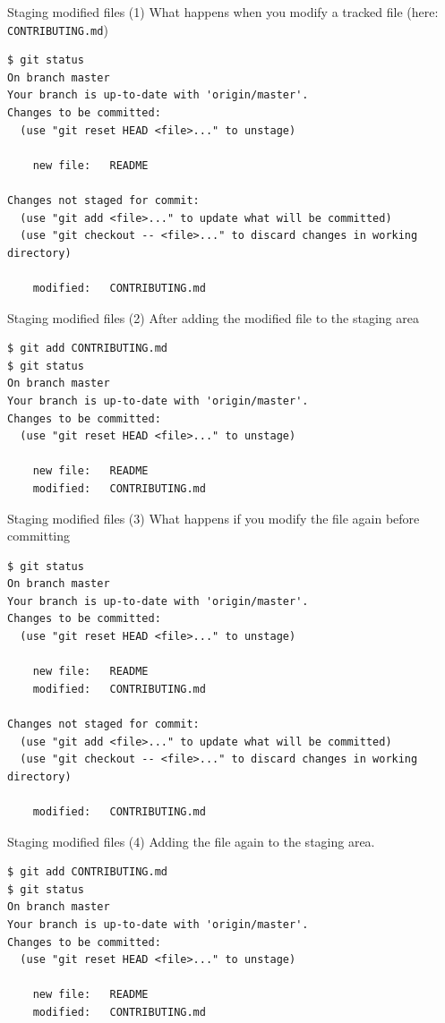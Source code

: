 \documentclass[handout]{beamer}
\begin{document}
\begin{frame}[fragile]{Staging modified files (1)}
What happens when you modify a tracked file (here: \texttt{CONTRIBUTING.md})
\begin{lstlisting}
$ git status
On branch master
Your branch is up-to-date with 'origin/master'.
Changes to be committed:
  (use "git reset HEAD <file>..." to unstage)

    new file:   README

Changes not staged for commit:
  (use "git add <file>..." to update what will be committed)
  (use "git checkout -- <file>..." to discard changes in working directory)

    modified:   CONTRIBUTING.md
\end{lstlisting}
\end{frame}

\begin{frame}[fragile]{Staging modified files (2)}
After adding the modified file to the staging area
\begin{lstlisting}
$ git add CONTRIBUTING.md
$ git status
On branch master
Your branch is up-to-date with 'origin/master'.
Changes to be committed:
  (use "git reset HEAD <file>..." to unstage)

    new file:   README
    modified:   CONTRIBUTING.md
\end{lstlisting}
\end{frame}

\begin{frame}[fragile]{Staging modified files (3)}
What happens if you modify the file again before committing
\begin{lstlisting}
$ git status
On branch master
Your branch is up-to-date with 'origin/master'.
Changes to be committed:
  (use "git reset HEAD <file>..." to unstage)

    new file:   README
    modified:   CONTRIBUTING.md

Changes not staged for commit:
  (use "git add <file>..." to update what will be committed)
  (use "git checkout -- <file>..." to discard changes in working directory)

    modified:   CONTRIBUTING.md
\end{lstlisting}
\end{frame}

\begin{frame}[fragile]{Staging modified files (4)}
Adding the file again to the staging area.
\begin{lstlisting}
$ git add CONTRIBUTING.md
$ git status
On branch master
Your branch is up-to-date with 'origin/master'.
Changes to be committed:
  (use "git reset HEAD <file>..." to unstage)

    new file:   README
    modified:   CONTRIBUTING.md
\end{lstlisting}
\end{frame}
\end{document}
